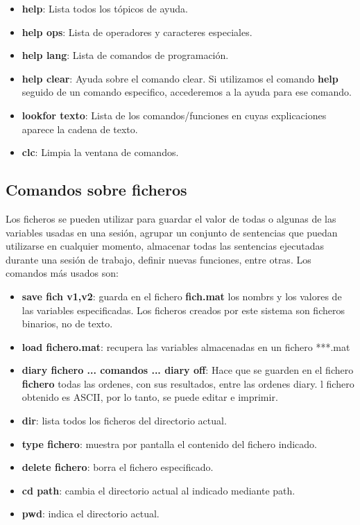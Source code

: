 \begin{itemize}
\item \textbf{help}: Lista todos los tópicos de ayuda.
\item \textbf{help ops}: Lista de operadores y caracteres especiales.
\item \textbf{help lang}: Lista de comandos de programación.
\item \textbf{help clear}: Ayuda sobre el comando clear. Si utilizamos el comando \textbf{help} seguido de un comando especifico, accederemos a la ayuda para ese comando.
\item \textbf{lookfor texto}: Lista de los comandos/funciones en cuyas explicaciones aparece la cadena de texto.
\item \textbf{clc}: Limpia la ventana de comandos.
\end{itemize}

\subsection{Comandos sobre ficheros}

Los ficheros se pueden utilizar para guardar el valor de todas o algunas de las variables usadas en una sesión, agrupar un conjunto de sentencias que puedan utilizarse en cualquier momento, almacenar todas las sentencias ejecutadas durante una sesión de trabajo, definir nuevas funciones, entre otras. Los comandos más usados son:

\begin{itemize}
\item \textbf{save fich v1,v2}: guarda en el fichero \textbf{fich.mat} los nombrs y los valores de las variables especificadas. Los ficheros creados por este sistema son ficheros binarios, no de texto.
\item \textbf{load fichero.mat}: recupera las variables almacenadas en un fichero ***.mat
\item \textbf{diary fichero ... comandos ... diary off}: Hace que se guarden en el fichero \textbf{fichero} todas las ordenes, con sus resultados, entre las ordenes diary. l fichero obtenido es ASCII, por lo tanto, se puede editar e imprimir.
\item \textbf{dir}: lista todos los ficheros del directorio actual.
\item \textbf{type fichero}: muestra por pantalla el contenido del fichero indicado.
\item \textbf{delete fichero}: borra el fichero especificado.
\item \textbf{cd path}: cambia el directorio actual al indicado mediante path.
\item \textbf{pwd}: indica el directorio actual.
\end{itemize}

